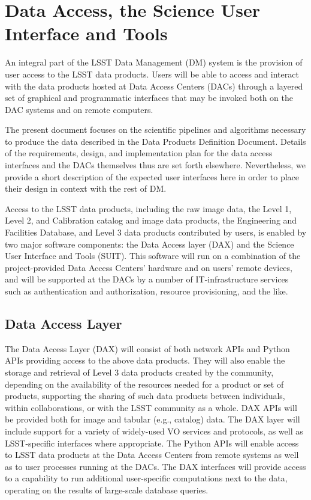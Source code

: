\section{Data Access, the Science User Interface and Tools}
\label{sec:suit}

An integral part of the LSST Data Management (DM) system is the provision of user access to the
LSST data products. Users will be able to access and interact with the data products hosted at
Data Access Centers (DACs) through a layered set of graphical and programmatic interfaces that
may be invoked both on the DAC systems and on remote computers.

The present document focuses on the scientific pipelines and algorithms necessary to produce
the data described in the Data Products Definition Document. Details of the requirements, design,
and implementation plan for the data access interfaces and the DACs themselves thus are set forth
elsewhere. Nevertheless, we provide a short description of the expected user interfaces here in order
to place their design in context with the rest of DM.

Access to the LSST data products, including the raw image data, the Level 1, Level 2, and Calibration
catalog and image data products, the Engineering and Facilities Database, and Level 3 data products
contributed by users, is enabled by two major software components: the Data Access layer (DAX) and
the Science User Interface and Tools (SUIT). This software will run on a combination of the
project-provided Data Access Centers' hardware and on users' remote devices, and will be supported
at the DACs by a number of IT-infrastructure services such as authentication and authorization,
resource provisioning, and the like.

\subsection{Data Access Layer}

The Data Access Layer (DAX) will consist of both network APIs and Python APIs providing access to
the above data products. They will also enable the storage and retrieval of Level 3 data products created
by the community, depending on the availability of the resources needed for a product or set of products,
supporting the sharing of such data products between individuals, within collaborations, or with the
LSST community as a whole. DAX APIs will be provided both for image and tabular (e.g., catalog) data.
The DAX layer will include support for a variety of widely-used VO services and protocols, as well as
LSST-specific interfaces where appropriate. The Python APIs will enable access to LSST data products
at the Data Access Centers from remote systems as well as to user processes running at the DACs.
The DAX interfaces will provide access to a capability to run additional user-specific computations next
to the data, operating on the results of large-scale database queries.

